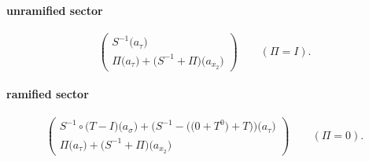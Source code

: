 \paragraph{unramified sector}
\[\begin{pmatrix}S^{-1}\bigl(a_{\tau}\bigr)\\\Pi\bigl(a_{\tau}\bigr)+\bigl(S^{-1}+\Pi\bigr)\bigl(a_{x_{2}}\bigr)\end{pmatrix}\qquad(\Pi=I).\]
\paragraph{ramified sector}
\[\begin{pmatrix}S^{-1}\circ \bigl(T-I\bigr)\bigl(a_{\sigma}\bigr)+\bigl(S^{-1}-\bigl(\bigl(0+T^{0}\bigr)+T\bigr)\bigr)\bigl(a_{\tau}\bigr)\\\Pi\bigl(a_{\tau}\bigr)+\bigl(S^{-1}+\Pi\bigr)\bigl(a_{x_{2}}\bigr)\end{pmatrix}\qquad(\Pi=0).\]
